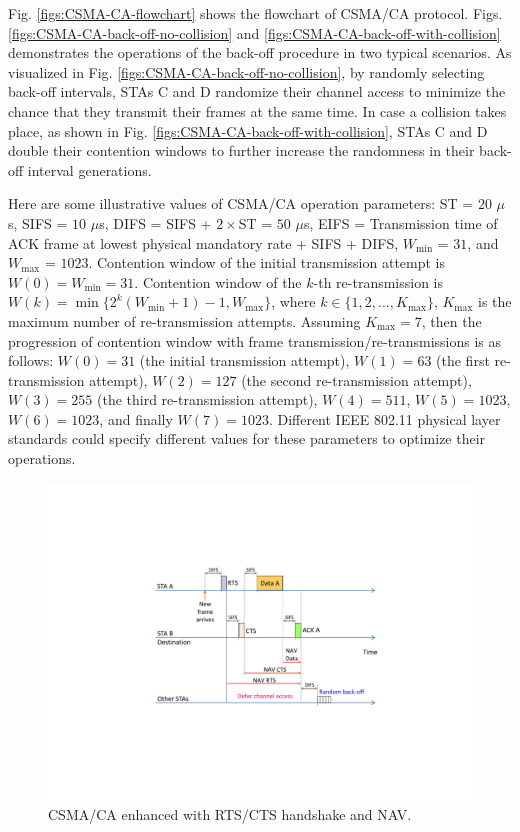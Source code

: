 Fig. \ref{figs:CSMA-CA-flowchart} shows the flowchart of CSMA/CA protocol. Figs. \ref{figs:CSMA-CA-back-off-no-collision} and \ref{figs:CSMA-CA-back-off-with-collision} demonstrates the operations of the back-off procedure in two typical scenarios. As visualized in Fig. \ref{figs:CSMA-CA-back-off-no-collision}, by randomly selecting back-off intervals, STAs C and D randomize their channel access to minimize the chance that they transmit their frames at the same time. In case a collision takes place, as shown in Fig. \ref{figs:CSMA-CA-back-off-with-collision}, STAs C and D double their contention windows to further increase the randomness in their back-off interval generations.

Here are some illustrative values of CSMA/CA operation parameters: ST = $20$ $\mu$s, SIFS = $10$ $\mu$s, DIFS = SIFS + $2\times$ST = $50$ $\mu$s, EIFS = Transmission time of ACK frame at lowest physical mandatory rate + SIFS + DIFS, $W_{\min}$ = $31$, and $W_{\max}$ = $1023$. Contention window of the initial transmission attempt is $W(0)=W_{\min}=31$. Contention window of the $k$-th re-transmission is $W(k)=\min\{2^{k}(W_{\min}+1)-1, W_{\max}\}$, where $k \in \{1,2, ..., K_{\max}\}$, $K_{\max}$ is the maximum number of re-transmission attempts. Assuming $K_{\max}=7$, then the progression of contention window with frame transmission/re-transmissions is as follows: $W(0)=31$ (the initial transmission attempt), $W(1)=63$ (the first re-transmission attempt), $W(2)=127$ (the second re-transmission attempt), $W(3)=255$ (the third re-transmission attempt), $W(4)=511$, $W(5)=1023$, $W(6)=1023$, and finally $W(7)=1023$. Different IEEE 802.11 physical layer standards could specify different values for these parameters to optimize their operations.

\begin{figure}[!t]
	\centering
	\includegraphics[width=0.65\columnwidth]{figures2/802-11-RTS-CTS-NAV}
	\caption{CSMA/CA enhanced with RTS/CTS handshake and NAV.}
	\label{figs:802-11-RTS-CTS-NAV}
\end{figure}

